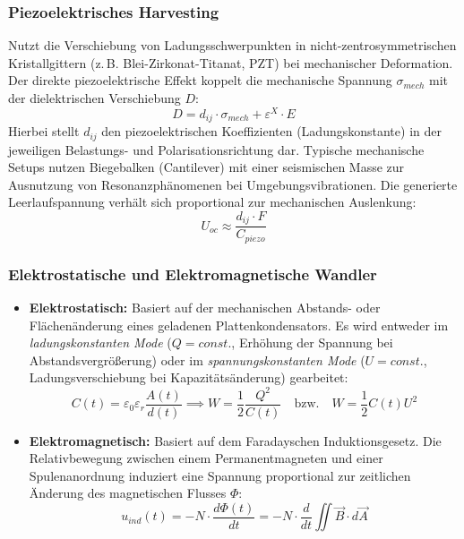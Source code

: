 \documentclass[8pt,a4paper]{article}
\begin{document}
\subsubsection{Piezoelektrisches Harvesting}
Nutzt die Verschiebung von Ladungsschwerpunkten in nicht-zentrosymmetrischen Kristallgittern (z.\,B. Blei-Zirkonat-Titanat, PZT) bei mechanischer Deformation. Der direkte piezoelektrische Effekt koppelt die mechanische Spannung $\sigma_{mech}$ mit der dielektrischen Verschiebung $D$:
\begin{equation}
    D = d_{ij} \cdot \sigma_{mech} + \varepsilon^X \cdot E
\end{equation}
Hierbei stellt $d_{ij}$ den piezoelektrischen Koeffizienten (Ladungskonstante) in der jeweiligen Belastungs- und Polarisationsrichtung dar. Typische mechanische Setups nutzen Biegebalken (Cantilever) mit einer seismischen Masse zur Ausnutzung von Resonanzphänomenen bei Umgebungsvibrationen. Die generierte Leerlaufspannung verhält sich proportional zur mechanischen Auslenkung:
\begin{equation}
    U_{oc} \approx \frac{d_{ij} \cdot F}{C_{piezo}}
\end{equation}

\subsubsection{Elektrostatische und Elektromagnetische Wandler}
\begin{itemize}
    \item \textbf{Elektrostatisch:} Basiert auf der mechanischen Abstands- oder Flächenänderung eines geladenen Plattenkondensators. Es wird entweder im \textit{ladungskonstanten Mode} ($Q=const.$, Erhöhung der Spannung bei Abstandsvergrößerung) oder im \textit{spannungskonstanten Mode} ($U=const.$, Ladungsverschiebung bei Kapazitätsänderung) gearbeitet:
    \begin{equation}
        C(t) = \varepsilon_0 \varepsilon_r \frac{A(t)}{d(t)} \implies W = \frac{1}{2} \frac{Q^2}{C(t)} \quad \text{bzw.} \quad W = \frac{1}{2} C(t) U^2
    \end{equation}
    \item \textbf{Elektromagnetisch:} Basiert auf dem Faradayschen Induktionsgesetz. Die Relativbewegung zwischen einem Permanentmagneten und einer Spulenanordnung induziert eine Spannung proportional zur zeitlichen Änderung des magnetischen Flusses $\Phi$:
    \begin{equation}
        u_{ind}(t) = -N \cdot \frac{d\Phi(t)}{dt} = -N \cdot \frac{d}{dt} \iint \vec{B} \cdot d\vec{A}
    \end{equation}
\end{itemize}
\end{document}
